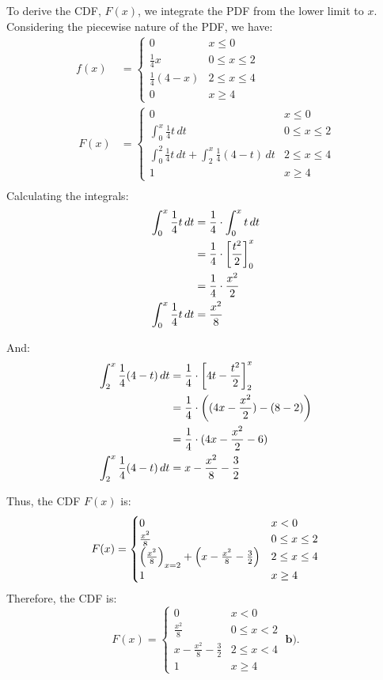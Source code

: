 \documentclass[a4paper, 10pt]{article}
\begin{document}
\begin{solution}
To derive the CDF, \( F(x) \), we integrate the PDF from the lower limit to \( x \). \\
Considering the piecewise nature of the PDF, we have:
\begin{align*}
    f(x) &= \begin{cases}
        0 & x \le 0 \\
        \frac{1}{4}x & 0 \leq x \le 2 \\
        \frac{1}{4}(4 - x) & 2 \leq x \le 4 \\
        0 & x \geq 4
    \end{cases} \\ \
    F(x) &= \begin{cases}
        0 & x \le 0 \\
        \int_{0}^{x} \frac{1}{4}t\,dt & 0 \leq x \le 2 \\
        \int_{0}^{2} \frac{1}{4}t\,dt + \int_{2}^{x} \frac{1}{4}(4 - t)\,dt & 2 \leq x \le 4 \\
        1 & x \geq 4
    \end{cases} \\
\end{align*}
Calculating the integrals:
\begin{align*}
    \int_{0}^{x} \frac{1}{4}t\,dt &= \frac{1}{4} \cdot \int_{0}^{x} t\,dt \\
    &= \frac{1}{4} \cdot \left[\frac{t^2}{2}\right]_{0}^{x} \\
    &= \frac{1}{4} \cdot \frac{x^2}{2} \\
    \int_{0}^{x} \frac{1}{4}t\,dt &= \frac{x^2}{8} \\
\end{align*}

And:
\begin{align*}
    \int_{2}^{x} \frac{1}{4}(4 - t)\,dt &= \frac{1}{4} \cdot \left[4t - \frac{t^2}{2}\right]_{2}^{x} \\
    &= \frac{1}{4} \cdot \left((4x - \frac{x^2}{2}) - (8 - 2)\right) \\
    &= \frac{1}{4} \cdot (4x - \frac{x^2}{2} - 6) \\
    \int_{2}^{x} \frac{1}{4}(4 - t)\,dt &= x - \frac{x^2}{8} - \frac{3}{2} \\
\end{align*}

Thus, the CDF \( F(x) \) is:
\[
F(x) = \begin{cases}
    0 & x < 0 \\
    \frac{x^2}{8} & 0 \leq x \le 2 \\
    \left(\frac{x^2}{8}\right)_{x=2} + \left(x - \frac{x^2}{8} - \frac{3}{2}\right) & 2 \leq x \le 4 \\
    1 & x \geq 4
\end{cases}
\]
Therefore, the CDF is:
\[
\boxed{F(x) = \begin{cases}
    0 & x < 0 \\
    \frac{x^2}{8} & 0 \leq x < 2 \\
    x - \frac{x^2}{8} - \frac{3}{2} & 2 \leq x < 4 \\
    1 & x \geq 4
\end{cases}} \; \textbf{b).}
\]
\end{solution}
\end{document}
